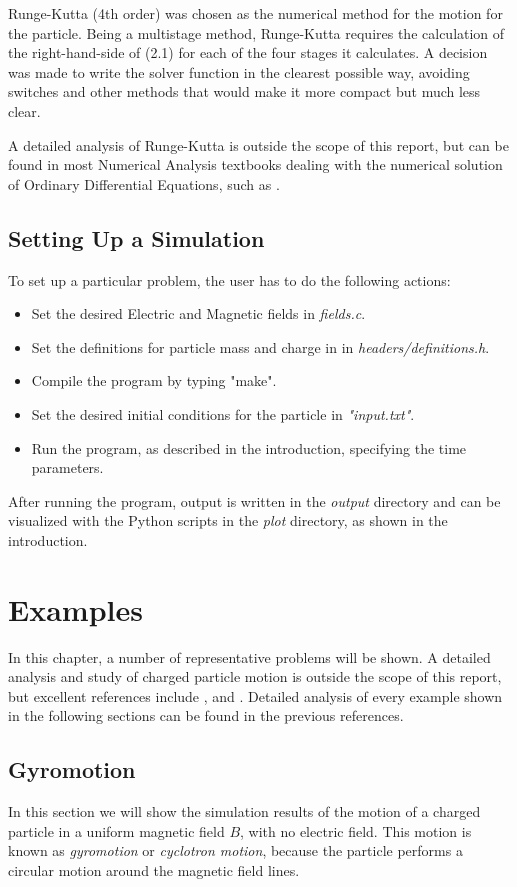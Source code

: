 \documentclass[11pt]{report}
\begin{document}
Runge-Kutta (4th order) was chosen as the numerical method for the motion for the particle. Being a multistage method, Runge-Kutta requires the calculation of the right-hand-side of (2.1) for each of the four stages it calculates. A decision was made to write the solver function in the clearest possible way, avoiding switches and other methods that would make it more compact but much less clear.
\newline

A detailed analysis of Runge-Kutta is outside the scope of this report, but can be found in most Numerical Analysis textbooks dealing with the numerical solution of Ordinary Differential Equations, such as \cite{leveque}.

\newpage
\section{Setting Up a Simulation}
To set up a particular problem, the user has to do the following actions:

\begin{itemize}
\item Set the desired Electric and Magnetic fields in \emph{fields.c}.
\item Set the definitions for particle mass and charge in in \emph{headers/definitions.h}.
\item Compile the program by typing "make".
\item Set the desired initial conditions for the particle in \emph{"input.txt"}.
\item Run the program, as described in the introduction, specifying the time parameters.
\end{itemize}

After running the program, output is written in the \emph{output} directory and can be visualized with the Python scripts in the \emph{plot} directory, as shown in the introduction.

\chapter{Examples}
In this chapter, a number of representative problems will be shown. A detailed analysis and study of charged particle motion is outside the scope of this report, but excellent references include \cite{goldston}, \cite{freidberg} and \cite{bellan}. Detailed analysis of every example shown in the following sections can be found in the previous references.

\section{Gyromotion}
In this section we will show the simulation results of the motion of a charged particle in a uniform magnetic field $B$, with no electric field. This motion is known as \emph{gyromotion} or \emph{cyclotron motion}, because the particle performs a circular motion around the magnetic field lines. 
\newline
\end{document}
